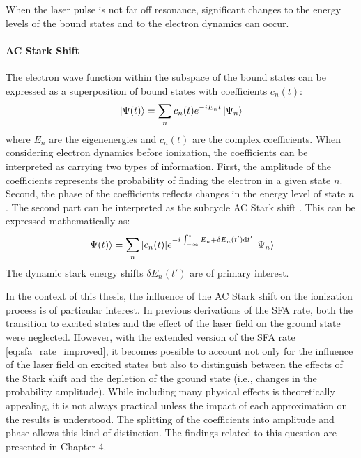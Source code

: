 When the laser pulse is not far off resonance, significant changes to the energy levels of the bound states and to the electron dynamics can occur.

\paragraph{AC Stark Shift}
The electron wave function within the subspace of the bound states can be expressed as a superposition of bound states with coefficients $c_n(t)$:
\begin{equation*}
    \ket{\Psi(t)} = \sum_n c_n(t) e^{-iE_nt}\ket{\Psi_n}
\end{equation*}
where $E_n$ are the eigenenergies and $c_n(t)$ are the complex coefficients.
When considering electron dynamics before ionization, the coefficients can be interpreted as carrying two types of information.
First, the amplitude of the coefficients represents the probability of finding the electron in a given state $n$.
Second, the phase of the coefficients reflects changes in the energy level of state $n$.
The second part can be interpreted as the subcycle AC Stark shift \cite{subsycleacstarkshift}.
This can be expressed mathematically as:
\begin{equation}
    \ket{\Psi(t)} = \sum_n |c_n(t)| e^{-i\int_{-\infty}^{t}E_n + \delta E_n(t')\mathrm{d} t'}\ket{\Psi_n}      \label{eq:ac_stark_shift}
\end{equation}
The dynamic stark energy shifts $\delta E_n(t')$ are of primary interest.

\bigskip
In the context of this thesis, the influence of the AC Stark shift on the ionization process is of particular interest.
In previous derivations of the SFA rate, both the transition to excited states and the effect of the laser field on the ground state were neglected.
However, with the extended version of the SFA rate \eqref{eq:sfa_rate_improved}, it becomes possible to account not only for the influence of the laser field on excited states but also to distinguish between the effects of the Stark shift and the depletion of the ground state (i.e., changes in the probability amplitude).
While including many physical effects is theoretically appealing, it is not always practical unless the impact of each approximation on the results is understood.
The splitting of the coefficients into amplitude and phase allows this kind of distinction.
The findings related to this question are presented in Chapter 4.






